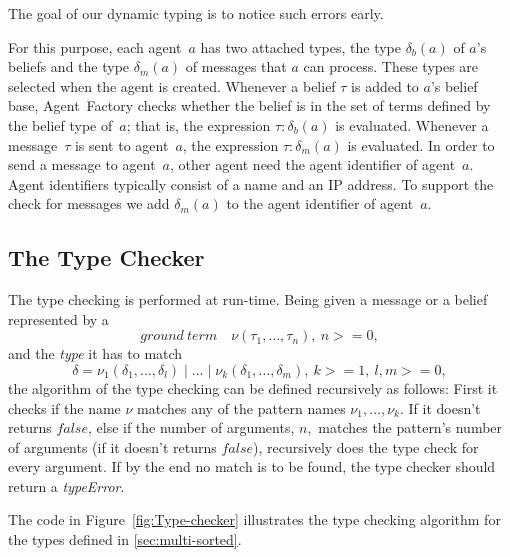 \documentclass[preprint]{sigplanconf} %
\theoremstyle{remark}
\begin{document}
The goal of our dynamic typing is to notice such errors early.

For this purpose, each agent~$a$ has two attached types, the type
$\delta_b(a)$ of $a$'s beliefs and the type $\delta_m(a)$ of messages that
$a$ can process. These types are selected when the agent is created.
Whenever a belief $\tau$ is added to $a$'s belief base, Agent~Factory
checks whether the belief is in the set of terms defined by the belief type
of~$a$; that is, the expression $\tau:\delta_b(a)$ is evaluated. Whenever a
message~$\tau$ is sent to agent~$a$, the expression $\tau:\delta_m(a)$ is
evaluated. In order to send a message to agent~$a$, other agent need the
agent identifier of agent~$a$. Agent identifiers typically consist of a
name and an IP address. To support the check for messages we add
$\delta_m(a)$ to the agent identifier of agent~$a$.

\subsection{The Type Checker}

The type checking is performed at run-time. Being given a message or a
belief represented by a \[\mathit{ground\
term}\quad\nu(\tau_1,\ldots,\tau_n),\ n>=0,\] and the \textit{type} it has
to match \[\delta = \nu_1(\delta_1, \ldots, \delta_l) \mid \ldots \mid
\nu_k(\delta_1, \ldots, \delta_m),\ k >= 1,\ l,m >= 0,\] the algorithm of
the type checking can be defined recursively as follows: First it checks if
the name $\nu$ matches any of the pattern names $\nu_1,\ldots, \nu_k$. If
it doesn't returns $false$, else if the number of arguments, $n,$ matches
the pattern's number of arguments (if it doesn't returns $false$),
recursively does the type check for every argument. If by the end no match
is to be found, the type checker should return a \textit{typeError}.

The code in Figure~\ref{fig:Type-checker} illustrates the type checking
algorithm for the types defined in \autoref{sec:multi-sorted}.
\end{document}
